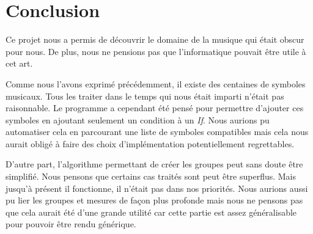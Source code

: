 \section{Conclusion}

Ce projet nous a permis de découvrir le domaine de la musique qui était obscur pour nous. De plus, nous ne pensions pas que l'informatique pouvait être utile à cet art.

\par
Comme nous l'avons exprimé précédemment, il existe des centaines de symboles musicaux. Tous les traiter dans le temps qui nous était imparti n'était pas raisonnable. Le programme a cependant été pensé pour permettre d'ajouter ces symboles en ajoutant seulement un condition à un \emph{If}. Nous aurions pu automatiser cela en parcourant une liste de symboles compatibles mais cela nous aurait obligé à faire des choix d'implémentation potentiellement regrettables.

\par
D'autre part, l'algorithme permettant de créer les groupes peut sans doute être simplifié. Nous pensons que certains cas traités sont peut être superflus. Mais jusqu'à présent il fonctionne, il n'était pas dans nos priorités. Nous aurions aussi pu lier les groupes et mesures de façon plus profonde mais nous ne pensons pas que cela aurait été d'une grande utilité car cette partie est assez généralisable pour pouvoir être rendu générique.
